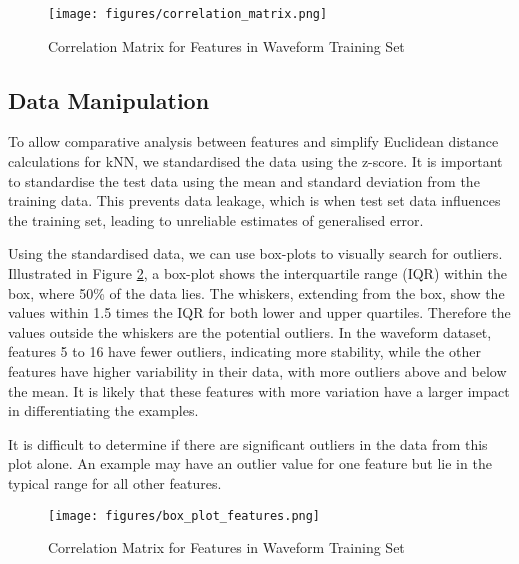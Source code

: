 \documentclass{article}
\theoremstyle{plain}
\theoremstyle{definition}
\theoremstyle{remark}
\begin{document}
        \begin{figure}[h]
            \centering
            \begin{minipage}[t]{0.7\linewidth}
                \centering
                \texttt{[image: figures/correlation\_matrix.png]}
                \caption{Correlation Matrix for Features in Waveform Training Set}
                \label{fig:corr_matrix}
            \end{minipage}%
        \end{figure}

    \subsection{Data Manipulation}
        \label{sec:data_manip}
        To allow comparative analysis between features and simplify Euclidean distance calculations for kNN, we standardised the data using the z-score. It is important to standardise the test data using the mean and standard deviation from the training data. This prevents data leakage, which is when test set data influences the training set, leading to unreliable estimates of generalised error.

        Using the standardised data, we can use box-plots to visually search for outliers. Illustrated in Figure \ref{fig:box_features}, a box-plot shows the interquartile range (IQR) within the box, where 50\% of the data lies. The whiskers, extending from the box, show the values within 1.5 times the IQR for both lower and upper quartiles. Therefore the values outside the whiskers are the potential outliers. In the waveform dataset, features 5 to 16 have fewer outliers, indicating more stability, while the other features have higher variability in their data, with more outliers above and below the mean. It is likely that these features with more variation have a larger impact in differentiating the examples.

        It is difficult to determine if there are significant outliers in the data from this plot alone. An example may have an outlier value for one feature but lie in the typical range for all other features.

        \begin{figure}[h]
            \centering
            \begin{minipage}[t]{0.7\linewidth}
                \centering
                \texttt{[image: figures/box\_plot\_features.png]}
                \caption{Correlation Matrix for Features in Waveform Training Set}
                \label{fig:box_features}
            \end{minipage}%
        \end{figure}
\end{document}
